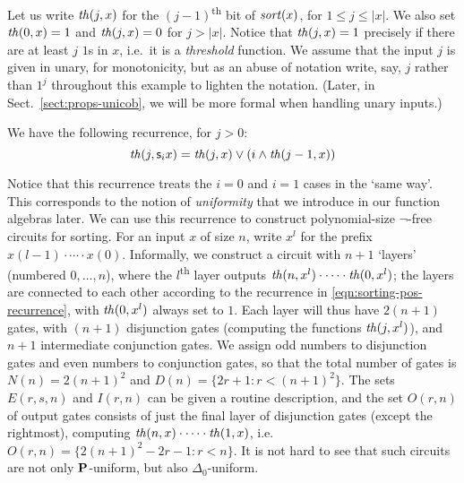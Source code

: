 \documentclass{lmcs}
\begin{document}
\begin{example}
	\label{ex:circuits-sort}
	Let us write $\mathit{th} (j,x)$ for the $(j-1)$\textsuperscript{th} bit of $\mathit{sort}(x)$, for $1\leq j \leq|x|$. We also set $\mathit{th}(0,x) = 1$ and $\mathit{th} (j , x) = 0 $ for $j > |x|$.
	Notice that $\mathit{th}(j,x) = 1$ precisely if there are at least $j$ $1$s in $x$, i.e.\ it is a \emph{threshold} function.
%
	We assume that the input $j$ is given in unary, for monotonicity, but as an abuse of notation write, say, $j$ rather than $1^j$ throughout this example to lighten the notation.
	(Later, in Sect.~\ref{sect:props-unicob}, we will be more formal when handling unary inputs.)

\noindent
We have the following recurrence, for $j>0$:
\begin{equation}
\label{eqn:sorting-pos-recurrence}
	\mathit{th} (j , \mathsf s_{i} x ) = \mathit{th} (j , x) \vee ( i \wedge \mathit{th}(j-1 , x) )
\end{equation}

Notice that this recurrence treats the $i = 0 $ and $i=1$ cases in the `same way'. This corresponds to the notion of \emph{uniformity} that we introduce in our function algebras later.
	We can use this recurrence to construct polynomial-size $\neg$-free circuits for sorting.
	For an input $x$ of size $n$, write $x^l$ for the prefix $x(l-1) \cdot  \cdots \cdot x(0)$. 
	Informally, we construct a circuit with $n+1$ `layers' (numbered $0,\dots , n$), where the $l$\textsuperscript{th} layer outputs $\mathit{th} (n, x^l) \cdot \cdots \cdot \mathit{th} (0,x^l)$; the layers are connected to each other according to the recurrence in \eqref{eqn:sorting-pos-recurrence}, with $\mathit{th}(0,x^l)$ always set to $1$. 
	Each layer will thus have $2(n+1)$ gates, with $(n+1)$ disjunction gates (computing the functions $\mathit{th}(j,x^l)$), and $n+1$ intermediate conjunction gates.
	We assign odd numbers to disjunction gates and even numbers to conjunction gates, so that the total number of gates is $N(n) = 2(n+1)^2$ and $D(n) = \{2r+1 : r< (n+1)^2 \}$.
	The sets $E(r,s, n)$ and $I (r,n)$ can be given a routine description, and the set $O(r,n)$ of output gates consists of just the final layer of disjunction gates (except the rightmost), computing $\mathit{th} (n,x) \cdot \cdots \cdot \mathit{th} (1,x)$, i.e.\ $O(r,n) = \{ 2(n+1)^2 - 2r - 1 : r < n \}$.
	It is not hard to see that such circuits are not only $\mathbf{P}$-uniform, but also $\Delta_0$-uniform. 
\end{example}
\end{document}
